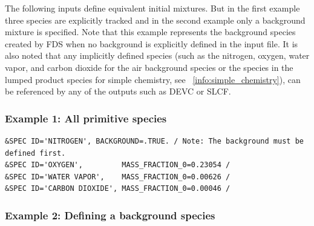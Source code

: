 \documentclass[11pt]{book}
\begin{document}
The following inputs define equivalent initial mixtures. But in the first example three species are explicitly tracked and in the second example only a background mixture is specified.  Note that this example represents the background species created by FDS when no background is explicitly defined in the input file.  It is also noted that any implicitly defined species (such as the nitrogen, oxygen, water vapor, and carbon dioxide for the air background species or the species in the lumped product species for simple chemistry, see ~\ref{info:simple_chemistry}), can be referenced by any of the outputs such as {\ct DEVC} or {\ct SLCF}.

\subsubsection{Example 1: All primitive species}

\begin{lstlisting}
&SPEC ID='NITROGEN', BACKGROUND=.TRUE. / Note: The background must be defined first.
&SPEC ID='OXYGEN',         MASS_FRACTION_0=0.23054 /
&SPEC ID='WATER VAPOR',    MASS_FRACTION_0=0.00626 /
&SPEC ID='CARBON DIOXIDE', MASS_FRACTION_0=0.00046 /
\end{lstlisting}

\subsubsection{Example 2: Defining a background species}
\end{document}
